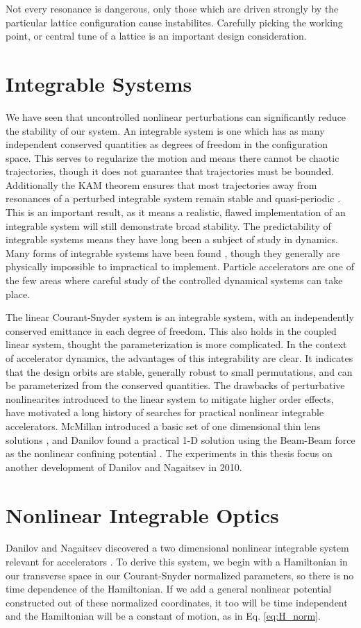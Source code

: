 Not every resonance is dangerous, only those which are driven strongly by the particular lattice configuration cause instabilites. Carefully picking the working point, or central tune of a lattice is an important design consideration.

\section{Integrable Systems} \label{sec:integral}
We have seen that uncontrolled nonlinear perturbations can significantly reduce the stability of our system. An integrable system is one which has as many independent conserved quantities as degrees of freedom in the configuration space. This serves to regularize the motion and means there cannot be chaotic trajectories, though it does not guarantee that trajectories must be bounded. Additionally the KAM theorem ensures that most trajectories away from resonances of a perturbed integrable system remain stable and quasi-periodic \cite{Moser}. This is an important result, as it means a realistic, flawed implementation of an integrable system will still demonstrate broad stability. The predictability of integrable systems means they have long been a subject of study in dynamics. Many forms of integrable systems have been found \cite{Heiterinta}, though they generally are physically impossible to impractical to implement. Particle accelerators are one of the few areas where careful study of the controlled dynamical systems can take place.

The linear Courant-Snyder system is an integrable system, with an independently conserved emittance in each degree of freedom. This also holds in the coupled linear system, thought the parameterization is more complicated. In the context of accelerator dynamics, the advantages of this integrability are clear. It indicates that the design orbits are stable, generally robust to small permutations, and can be parameterized from the conserved quantities. The drawbacks of perturbative nonlinearites introduced to the linear system to mitigate higher order effects, have motivated a long history of searches for practical nonlinear integrable accelerators. McMillan introduced a basic set of one dimensional thin lens solutions \cite{McMillan}, and Danilov found a practical 1-D solution using the Beam-Beam force as the nonlinear confining potential \cite{Danilov1D}. The experiments in this thesis focus on another development of Danilov and Nagaitsev in 2010.

\section{Nonlinear Integrable Optics} \label{sec:nio}
Danilov and Nagaitsev discovered a two dimensional nonlinear integrable system relevant for accelerators \cite{danilov_nonlinear_2010}. To derive this system, we begin with a Hamiltonian in our transverse space in our Courant-Snyder normalized parameters, so there is no time dependence of the Hamiltonian.  If we add a general nonlinear potential constructed out of these normalized coordinates, it too will be time independent and the Hamiltonian will be a constant of motion, as in Eq. \ref{eq:H_norm}.

